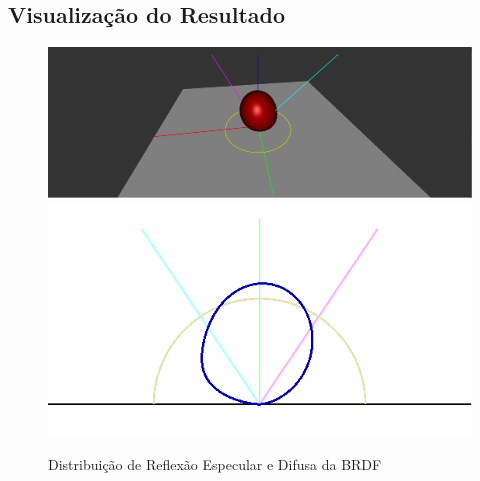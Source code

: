 \subsection{Visualização do Resultado}
\begin{figure}[H]
    \caption{\small{Distribuição de Reflexão Especular e Difusa da BRDF}}\label{fig-edwards-2006-plots}
    \vspace{42px}
  \includegraphics[width=\linewidth]{./Imagens/brdfs/edwards-2006-3D-plot}
\endminipage\hfill
{}
  \includegraphics[width=\linewidth]{./Imagens/brdfs/edwards-2006-polar-plot.png}
\endminipage\hfill
\end{figure}

